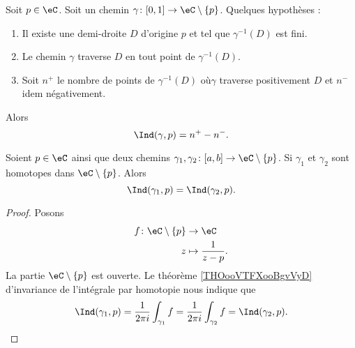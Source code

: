 \begin{proposition}     \label{PROPooXWULooFZgHfL}
	Soit \( p\in \eC\). Soit un chemin \( \gamma\colon \mathopen[ 0 , 1 \mathclose]\to \eC\setminus\{ p \}\). Quelques hypothèses :
	\begin{enumerate}
		\item
		      Il existe une demi-droite \( D\) d'origine \( p\) et tel que \( \gamma^{-1}(D)\) est fini.
		\item
		      Le chemin \( \gamma\) traverse \( D\) en tout point de \( \gamma^{-1}(D)\).
		\item
		      Soit \( n^+\) le nombre de points de \( \gamma^{-1}(D)\) où\( \gamma\) traverse positivement \( D\) et \( n^-\) idem négativement.
	\end{enumerate}
	Alors
	\begin{equation}
		\Ind(\gamma,p)=n^+-n^-.
	\end{equation}
\end{proposition}

\begin{proposition}       \label{PROPooEKFHooOWcIMk}
	Soient \( p\in \eC\) ainsi que deux chemins \( \gamma_1,\gamma_2\colon \mathopen[ a , b \mathclose]\to \eC\setminus \{ p \} \). Si \( \gamma_1\) et \( \gamma_2\) sont homotopes dans \( \eC\setminus \{ p \}\). Alors
	\begin{equation}
		\Ind(\gamma_1,p)=\Ind(\gamma_2,p).
	\end{equation}
\end{proposition}

\begin{proof}
	Posons
	\begin{equation}
		\begin{aligned}
			f\colon \eC\setminus\{ p \} & \to \eC                   \\
			z                           & \mapsto \frac{1}{ z-p } .
		\end{aligned}
	\end{equation}
	La partie \( \eC\setminus\{ p \}\) est ouverte. Le théorème \ref{THOooVTFXooBgvVyD} d'invariance de l'intégrale par homotopie nous indique que
	\begin{equation}
		\Ind(\gamma_1,p)=\frac{1}{ 2\pi i }\int_{\gamma_1}f=\frac{1}{ 2\pi i }\int_{\gamma_2}f=\Ind(\gamma_2,p).
	\end{equation}
\end{proof}

